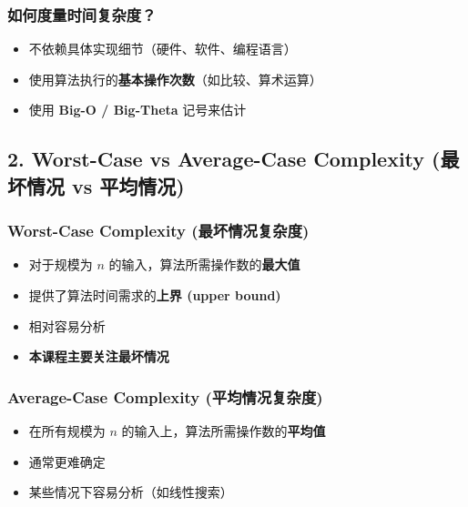 \documentclass[10pt,a4paper,openany]{ctexbook}
\theoremstyle{definition}
\theoremstyle{remark}
\begin{document}
\subsubsection{如何度量时间复杂度？}

\begin{itemize}
\item 不依赖具体实现细节（硬件、软件、编程语言）
\item 使用算法执行的\textbf{基本操作次数}（如比较、算术运算）
\item 使用 \textbf{Big-O / Big-Theta} 记号来估计

\end{itemize}

\vspace{-2pt}

\subsection{2. Worst-Case vs Average-Case Complexity (最坏情况 vs 平均情况)}

\subsubsection{Worst-Case Complexity (最坏情况复杂度)}

\begin{itemize}
\item 对于规模为 $n$ 的输入，算法所需操作数的\textbf{最大值}
\item 提供了算法时间需求的\textbf{上界 (upper bound)}
\item 相对容易分析
\item \textbf{本课程主要关注最坏情况}

\end{itemize}

\subsubsection{Average-Case Complexity (平均情况复杂度)}

\begin{itemize}
\item 在所有规模为 $n$ 的输入上，算法所需操作数的\textbf{平均值}
\item 通常更难确定
\item 某些情况下容易分析（如线性搜索）

\end{itemize}

\vspace{-2pt}
\end{document}
